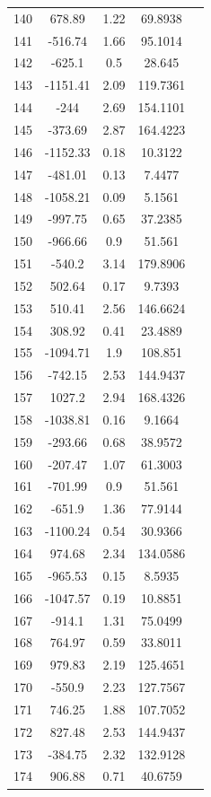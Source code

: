 {\begin{longtable}{ccccc}
140 & 678.89 & 1.22 & 69.8938 \\ 
141 & -516.74 & 1.66 & 95.1014 \\ 
142 & -625.1 & 0.5 & 28.645 \\ 
143 & -1151.41 & 2.09 & 119.7361 \\ 
144 & -244 & 2.69 & 154.1101 \\ 
145 & -373.69 & 2.87 & 164.4223 \\ 
146 & -1152.33 & 0.18 & 10.3122 \\ 
147 & -481.01 & 0.13 & 7.4477 \\ 
148 & -1058.21 & 0.09 & 5.1561 \\ 
149 & -997.75 & 0.65 & 37.2385 \\ 
150 & -966.66 & 0.9 & 51.561 \\ 
151 & -540.2 & 3.14 & 179.8906 \\ 
152 & 502.64 & 0.17 & 9.7393 \\ 
153 & 510.41 & 2.56 & 146.6624 \\ 
154 & 308.92 & 0.41 & 23.4889 \\ 
155 & -1094.71 & 1.9 & 108.851 \\ 
156 & -742.15 & 2.53 & 144.9437 \\ 
157 & 1027.2 & 2.94 & 168.4326 \\ 
158 & -1038.81 & 0.16 & 9.1664 \\ 
159 & -293.66 & 0.68 & 38.9572 \\ 
160 & -207.47 & 1.07 & 61.3003 \\ 
161 & -701.99 & 0.9 & 51.561 \\ 
162 & -651.9 & 1.36 & 77.9144 \\ 
163 & -1100.24 & 0.54 & 30.9366 \\ 
164 & 974.68 & 2.34 & 134.0586 \\ 
165 & -965.53 & 0.15 & 8.5935 \\ 
166 & -1047.57 & 0.19 & 10.8851 \\ 
167 & -914.1 & 1.31 & 75.0499 \\ 
168 & 764.97 & 0.59 & 33.8011 \\ 
169 & 979.83 & 2.19 & 125.4651 \\ 
170 & -550.9 & 2.23 & 127.7567 \\ 
171 & 746.25 & 1.88 & 107.7052 \\ 
172 & 827.48 & 2.53 & 144.9437 \\ 
173 & -384.75 & 2.32 & 132.9128 \\ 
174 & 906.88 & 0.71 & 40.6759 \\ 

\end{longtable}}
